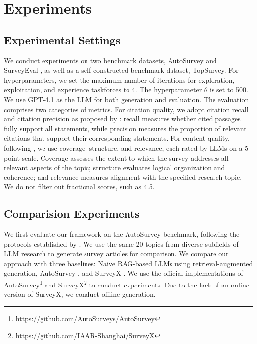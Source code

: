 \documentclass[manuscript,review,anonymous]{acmart}
\begin{document}
\section{Experiments}

\subsection{Experimental Settings}


We conduct experiments on two benchmark datasets, AutoSurvey \cite{wang2024autosurvey} and SurveyEval \cite{wang2025llm}, as well as a self-constructed benchmark dataset, TopSurvey. For hyperparameters, we set the maximum number of iterations for exploration, exploitation, and experience taskforces to 4. The hyperparameter $\theta$ is set to 500. We use GPT-4.1 as the LLM for both generation and evaluation. The evaluation comprises two categories of metrics. For citation quality, we adopt citation recall and citation precision as proposed by \citet{wang2024autosurvey}: recall measures whether cited passages fully support all statements, while precision measures the proportion of relevant citations that support their corresponding statements. For content quality, following \citet{wang2024autosurvey}, we use coverage, structure, and relevance, each rated by LLMs on a 5-point scale. Coverage assesses the extent to which the survey addresses all relevant aspects of the topic; structure evaluates logical organization and coherence; and relevance measures alignment with the specified research topic. We do not filter out fractional scores, such as 4.5.

\subsection{Comparision Experiments}

We first evaluate our framework on the AutoSurvey \cite{wang2024autosurvey} benchmark, following the protocols established by \citet{liang2025surveyx, wang2024autosurvey}. We use the same 20 topics from diverse subfields of LLM research to generate survey articles for comparison. We compare our approach with three baselines: Naive RAG-based LLMs using retrieval-augmented generation, AutoSurvey \cite{wang2024autosurvey}, and SurveyX \cite{liang2025surveyx}. We use the official implementations of AutoSurvey\footnote{https://github.com/AutoSurveys/AutoSurvey} and SurveyX\footnote{https://github.com/IAAR-Shanghai/SurveyX} to conduct experiments. Due to the lack of an online version of SurveyX, we conduct offline generation.
\end{document}
